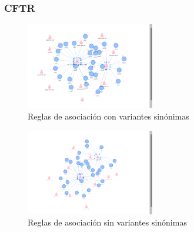 \subsubsection*{CFTR}

\begin{figure}[H]
	\centering
	\includegraphics[width=0.5\textwidth]{Kap4/CFTR1}
	\caption{Reglas de asociación con variantes sinónimas} \label{fig:r6}
\end{figure}

\begin{figure}[H]
	\centering
	\includegraphics[width=0.5\textwidth]{Kap4/CFRT2}
	\caption{Reglas de asociación sin variantes sinónimas} \label{fig:r6}
\end{figure}